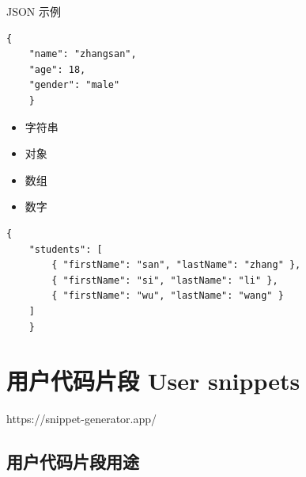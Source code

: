 \documentclass{beamer}
\begin{document}
\begin{frame}[fragile]{JSON 示例}
    \begin{minipage}{0.6\linewidth}
        \begin{lstlisting}[language=Tex]
{
    "name": "zhangsan",
    "age": 18,
    "gender": "male"
    }
\end{lstlisting}
    \end{minipage}\hspace{1cm}
    \begin{minipage}{0.2\linewidth}
        \begin{itemize}
            \item 字符串
            \item 对象
            \item 数组
            \item 数字
        \end{itemize}
    \end{minipage}
    \medskip
    \begin{minipage}{\linewidth}
        \begin{lstlisting}[language=Tex]
{
    "students": [
        { "firstName": "san", "lastName": "zhang" },
        { "firstName": "si", "lastName": "li" },
        { "firstName": "wu", "lastName": "wang" }
    ]
    }
\end{lstlisting}
    \end{minipage}\hspace{1cm}
\end{frame}

\section{用户代码片段 User snippets}

\begin{frame}
    https://snippet-generator.app/
\end{frame}


\subsection{用户代码片段用途}
\end{document}
